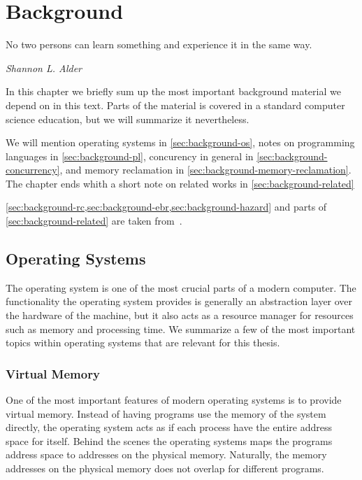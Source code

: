 \chapter{Background\label{ch:background}}

\epigraph{No two persons can learn something and experience it in the same way.}{\textit{Shannon L.
Alder}}

In this chapter we briefly sum up the most important background material we depend on in this text.
Parts of the material is covered in a standard computer science education, but we will summarize it
nevertheless.

We will mention operating systems in \cref{sec:background-os}, notes on programming languages in
\cref{sec:background-pl}, concurency in general in \cref{sec:background-concurrency}, and memory
reclamation in \cref{sec:background-memory-reclamation}. The chapter ends whith a short note on
related works in \cref{sec:background-related}


\cref{sec:background-rc,sec:background-ebr,sec:background-hazard} and parts of
\cref{sec:background-related} are taken from~\cite{semester}.

\clearpage


\section{Operating Systems\label{sec:background-os}}

The operating system is one of the most crucial parts of a modern computer.  The functionality the
operating system provides is generally an abstraction layer over the hardware of the machine, but
it also acts as a resource manager for resources such as memory and processing time. We summarize a
few of the most important topics within operating systems that are relevant for this thesis.


\subsection{Virtual Memory\label{sec:background-virtual-memory}}

One of the most important features of modern operating systems is to provide virtual memory.
Instead of having programs use the memory of the system directly, the operating system acts as if
each process have the entire address space for itself. Behind the scenes the operating systems maps
the programs address space to addresses on the physical memory. Naturally, the memory addresses on
the physical memory does not overlap for different programs.


